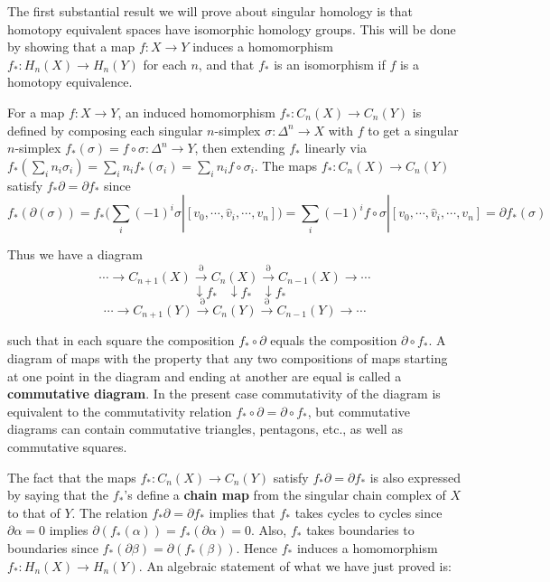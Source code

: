The first substantial result we will prove about singular homology is that homotopy equivalent spaces have isomorphic homology groups. This will be done by
showing that a map $f:X \to Y$ induces a homomorphism $f_*:H_n(X) \to H_n(Y)$ for each
$n$, and that $f_*$ is an isomorphism if $f$ is a homotopy equivalence.

For a map $f:X\to Y$, an induced homomorphism $f_*:C_n(X)\to C_n(Y)$ is defined
by composing each singular $n$-simplex $\sigma:\Delta^n \to X$ with $f$ to get a singular $n$-simplex
$f_*(\sigma) = f\circ\sigma:\Delta^n \to Y$, then extending $f_*$ linearly via $f_*(\sum_i n_i\sigma_i) = \sum_i n_if_*(\sigma_i) =
\sum_i n_if\circ\sigma_i$. The maps $f_*:C_n(X)\to C_n(Y)$ satisfy $f_*\partial = \partial f_*$ since
$$f_*(\partial(\sigma)) = f_*(\sum_i(-1)^i\sigma|[v_0,\cdots,\hat v_i,\cdots,v_n])
= \sum_i(-1)^if\circ\sigma|[v_0,\cdots,\hat v_i,\cdots,v_n] = \partial f_*(\sigma)$$

Thus we have a diagram
$$\cdots \to C_{n+1}(X) \xrightarrow{\partial} C_n(X) \xrightarrow{\partial} C_{n-1}(X) \to \cdots$$
$$\phantom{\cdots} \downarrow f_* \phantom{\cdots} \downarrow f_* \phantom{\cdots} \downarrow f_*$$
$$\cdots \to C_{n+1}(Y) \xrightarrow{\partial} C_n(Y) \xrightarrow{\partial} C_{n-1}(Y) \to \cdots$$

such that in each square the composition $f_*\circ\partial$ equals the composition $\partial\circ f_*$. A diagram
of maps with the property that any two compositions of maps starting at one point in
the diagram and ending at another are equal is called a \textbf{commutative diagram}. In the
present case commutativity of the diagram is equivalent to the commutativity relation
$f_*\circ\partial = \partial\circ f_*$, but commutative diagrams can contain commutative triangles, pentagons,
etc., as well as commutative squares.

The fact that the maps $f_*:C_n(X)\to C_n(Y)$ satisfy $f_*\partial = \partial f_*$ is also expressed
by saying that the $f_*$'s define a \textbf{chain map} from the singular chain complex of $X$
to that of $Y$. The relation $f_*\partial = \partial f_*$ implies that $f_*$ takes cycles to cycles since
$\partial\alpha = 0$ implies $\partial(f_*(\alpha)) = f_*(\partial\alpha) = 0$. Also, $f_*$ takes boundaries to boundaries
since $f_*(\partial\beta) = \partial(f_*(\beta))$. Hence $f_*$ induces a homomorphism $f_*:H_n(X)\to H_n(Y)$. An
algebraic statement of what we have just proved is:

